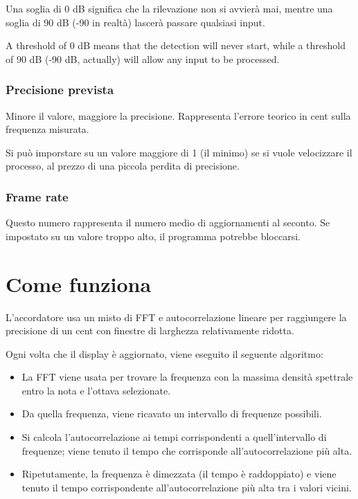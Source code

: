Una soglia di 0 dB significa che la rilevazione non si avvierà mai,
mentre una soglia di 90 dB (-90 in realtà) lascerà passare
qualsiasi input.

A threshold of 0 dB means that the detection will never start, while a threshold
of 90 dB (-90 dB, actually) will allow any input to be processed.

\subsection{Precisione prevista}\label{expectedprecision}

Minore il valore, maggiore la precisione. Rappresenta l'errore
teorico in cent sulla frequenza misurata.

Si può imporstare su un valore maggiore di 1 (il minimo)
se si vuole velocizzare il processo, al prezzo di una
piccola perdita di precisione.

\subsection{Frame rate}\label{framerate}

Questo numero rappresenta il numero medio di aggiornamenti al
seconto. Se impostato su un valore troppo alto, il programma
potrebbe bloccarsi.

\chapter{Come funziona}\label{howitworks}

L'accordatore  usa un misto di FFT e autocorrelazione
lineare per raggiungere la precisione di un cent con
finestre di larghezza relativamente ridotta.

Ogni volta che il display è aggiornato, viene eseguito il seguente algoritmo:
\begin{itemize}
  \item La FFT viene usata per trovare la frequenza con la massima densità spettrale entro la nota e l'ottava selezionate.
  \item Da quella frequenza, viene ricavato un intervallo di frequenze possibili.
  \item Si calcola l'autocorrelazione ai tempi corrispondenti a quell'intervallo di frequenze; viene tenuto il tempo che corrisponde all'autocorrelazione più alta.
  \item Ripetutamente, la frequenza è dimezzata (il tempo è raddoppiato) e viene tenuto il tempo corrispondente all'autocorrelazione più alta tra i valori vicini.
\end{itemize}


